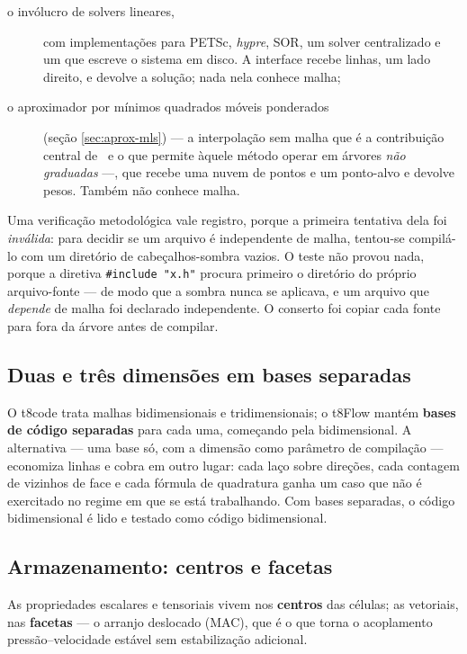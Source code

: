 \begin{description}
\item[o invólucro de solvers lineares,] com implementações para PETSc,
      \emph{hypre}, SOR, um solver centralizado e um que escreve o sistema em
      disco. A interface recebe linhas, um lado direito, e devolve a solução;
      nada nela conhece malha;
\item[o aproximador por mínimos quadrados móveis ponderados] (seção
      \ref{sec:aprox-mls}) --- a interpolação sem malha que é a contribuição
      central de~\cite{sousa2019} e o que permite àquele método operar em
      árvores \emph{não graduadas} ---, que recebe uma nuvem de pontos e um
      ponto-alvo e devolve pesos. Também não conhece malha.
\end{description}

Uma verificação metodológica vale registro, porque a primeira tentativa dela foi
\emph{inválida}: para decidir se um arquivo é independente de malha, tentou-se
compilá-lo com um diretório de cabeçalhos-sombra vazios. O teste não provou nada,
porque a diretiva \verb|#include "x.h"| procura primeiro o diretório do próprio
arquivo-fonte --- de modo que a sombra nunca se aplicava, e um arquivo que
\emph{depende} de malha foi declarado independente. O conserto foi copiar cada
fonte para fora da árvore antes de compilar.

\subsection{Duas e três dimensões em bases separadas}

O t8code trata malhas bidimensionais e tridimensionais; o t8Flow mantém
\textbf{bases de código separadas} para cada uma, começando pela
bidimensional. A alternativa --- uma base só, com a dimensão como parâmetro de
compilação --- economiza linhas e cobra em outro lugar: cada laço sobre direções,
cada contagem de vizinhos de face e cada fórmula de quadratura ganha um caso que
não é exercitado no regime em que se está trabalhando. Com bases separadas, o
código bidimensional é lido e testado como código bidimensional.

\subsection{Armazenamento: centros e facetas}

As propriedades escalares e tensoriais vivem nos \textbf{centros} das células; as
vetoriais, nas \textbf{facetas} --- o arranjo deslocado (MAC), que é o que torna
o acoplamento pressão--velocidade estável sem estabilização adicional.

